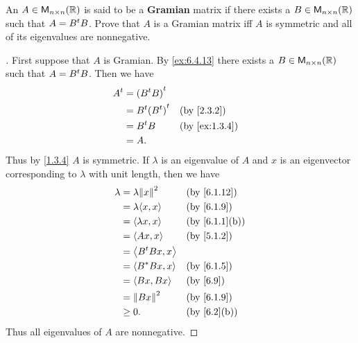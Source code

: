 \begin{ex}\label{ex:6.4.13}
  An \(A \in \mathsf{M}_{{n} \times n}({\mathbb{R}})\) is said to be a \textbf{Gramian} matrix if there exists a \(B \in \mathsf{M}_{{n} \times n}({\mathbb{R}})\) such that \(A = {B}^{t} B\).
  Prove that \(A\) is a Gramian matrix iff \(A\) is symmetric and all of its eigenvalues are nonnegative.
\end{ex}

\begin{proof}[]
  First suppose that \(A\) is Gramian.
  By \cref{ex:6.4.13} there exists a \(B \in \mathsf{M}_{{n} \times n}({\mathbb{R}})\) such that \(A = {B}^{t} B\).
  Then we have
  \begin{align*}
    \tp{A} & = \tp{(\tp{B} B)}                                       \\
           & = \tp{B} \tp{(\tp{B})} &  & \text{(by \cref{2.3.2})}    \\
           & = \tp{B} B             &  & \text{(by \cref{ex:1.3.4})} \\
           & = A.
  \end{align*}
  Thus by \cref{1.3.4} \(A\) is symmetric.
  If \(\lambda\) is an eigenvalue of \(A\) and \(x\) is an eigenvector corresponding to \(\lambda\) with unit length, then we have
  \begin{align*}
    \lambda & = \lambda \norm{x}^2  &  & \text{(by \cref{6.1.12})}   \\
            & = \lambda \inn{x, x}  &  & \text{(by \cref{6.1.9})}    \\
            & = \inn{\lambda x, x}  &  & \text{(by \cref{6.1.1}(b))} \\
            & = \inn{Ax, x}         &  & \text{(by \cref{5.1.2})}    \\
            & = \inn{\tp{B} B x, x}                                  \\
            & = \inn{B^* B x, x}    &  & \text{(by \cref{6.1.5})}    \\
            & = \inn{Bx, Bx}        &  & \text{(by \cref{6.9})}      \\
            & = \norm{Bx}^2         &  & \text{(by \cref{6.1.9})}    \\
            & \geq 0.               &  & \text{(by \cref{6.2}(b))}
  \end{align*}
  Thus all eigenvalues of \(A\) are nonnegative.


\end{proof}
